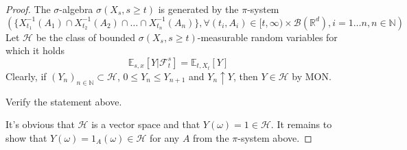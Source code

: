 \begin{proof}
    The $\sigma$-algebra $\sigma(X_s, s \ge t)$ is generated by the $\pi$-system
    $$\left(\{X_{t_1}^{-1}(A_1) \cap X_{t_2}^{-1}(A_2) \cap \dots \cap X_{t_n}^{-1}(A_n)\}, \forall (t_i, A_i) \in [t, \infty) \times \mathcal{B}(\mathbb{R}^d), i=1\dots n, n \in \mathbb{N} \right)$$
    Let $\mathcal{H}$ be the class of bounded $\sigma(X_s, s \ge t)$-measurable random variables for which it holds
    $$\mathbb{E}_{s,x}[Y | \mathcal{F}_t^s] = \mathbb{E}_{t, X_t}[Y]$$
    Clearly, if $(Y_n)_{n \in \mathbb{N}} \subset \mathcal{H}$, $0 \le Y_n \le Y_{n+1}$ and $Y_n \uparrow Y$, then $Y \in \mathcal{H}$ by MON.

    \begin{homework}
        Verify the statement above.
    \end{homework}
    
    It's obvious that $\mathcal{H}$ is a vector space and that $Y(\omega) = 1 \in \mathcal{H}$. It remains to show that $Y(\omega) = 1_A(\omega) \in \mathcal{H}$ for any $A$ from the $\pi$-system above.
    

\end{proof}

